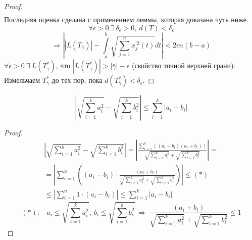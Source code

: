 \begin{proof}
\begin{multline*}
    \end{multline*}
    Последняя оценка сделана с применением леммы, которая доказана чуть ниже.
    \[\forall \epsilon > 0 \ \exists\ \delta_{\epsilon} > 0,\ d(T) < \delta_{\epsilon}\]
    \[\Rightarrow \left| |L(T_{\bar{\gamma}})| - \int\limits_{a}^{b} \sqrt{\sum_{j = 1}^{n} x_{j}^{'2}(t)} dt \right| < 2 \epsilon n (b-a)\]
    $\forall \epsilon > 0 \ \exists\ L(T^{*}_{\bar{\gamma}})$, что $|L(T^{*}_{\bar{\gamma}}) | > |\bar{\gamma}| - \epsilon$ (свойство точной верхней грани). \newline
    Измельчаем $T_{\bar{\gamma}}^{*}$ до тех пор, пока $d(T_{\bar{\gamma}}^{*}) < \delta_{\epsilon}$.
\end{proof}
\begin{lemma}
    \[\left| \sqrt{\sum\limits_{i = 1}^{k} a_i^2} - \sqrt{\sum_{i = 1}^{k} b_i^2} \right| \leq \sum\limits_{i = 1}^{k} |a_i - b_i|\]
\end{lemma}
\begin{proof}
    \begin{multline*}
        \left| \sqrt{\sum\limits_{i = 1}^{k} a_i^2} - \sqrt{\sum_{i = 1}^{k} b_i^2} \right| = \left| \frac{\sum\limits_{i = 1}^{k}\left( (a_i - b_i) (a_i + b_i)\right)}{\sqrt{\sum\limits_{i = 1}^{k} a_i^2} + \sqrt{\sum\limits_{i = 1}^{k} b_i^2}} \right| =\\
        =\left| \sum\limits_{i = 1}^{k}\left( (a_i - b_i)\cdot \frac{(a_i + b_i)}{\sqrt{\sum\limits_{i = 1}^{k} a_i^2} + \sqrt{\sum\limits_{i = 1}^{k} b_i^2}}\right) \right| \leq (*)\\ 
        \leq \left| \sum\limits_{i=1}^{n} 1\cdot (a_i-b_i)\right| \leq \sum\limits_{i = 1}^{k} |a_i - b_i|
    \end{multline*}
    \[(*):\ \ \ \  a_i \leq  \sqrt{\sum\limits_{i = 1}^{k} a_i^2},\ b_i \leq \sqrt{\sum\limits_{i = 1}^{k} b_i^2}\ \Rightarrow\ \frac{(a_i + b_i)}{\sqrt{\sum\limits_{i = 1}^{k} a_i^2} + \sqrt{\sum\limits_{i = 1}^{k} b_i^2}} \leq 1\]
\end{proof} 


